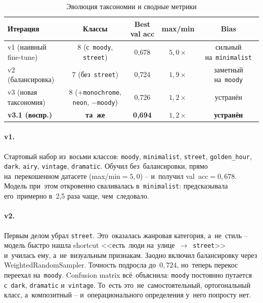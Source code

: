 \documentclass[a4paper,12pt]{diplom}
\begin{document}
\begin{table}[!ht]
\caption{Эволюция таксономии и сводные метрики}
\label{tab:taxonomy}
\centering
\begin{tabular}{lcccc}
\toprule
\textbf{Итерация} & \textbf{Классы} & \textbf{Best val acc} & \textbf{max/min} & \textbf{Bias} \\
\midrule
v1 (наивный fine-tune) & 8 (с~\texttt{moody}, \texttt{street}) & 0{,}678 & $5{,}0\times$ & сильный на~\texttt{minimalist} \\
v2 (балансировка)      & 7 (без~\texttt{street})              & 0{,}724 & $1{,}9\times$ & заметный на~\texttt{moody} \\
v3 (новая таксономия)  & 8 ($+$\texttt{monochrome}, \texttt{neon}, $-$\texttt{moody}) & 0{,}726 & $1{,}2\times$ & устранён \\
\textbf{v3.1 (воспр.)} & \textbf{та~же}                       & \textbf{0{,}694} & \textbf{$1{,}2\times$} & \textbf{устранён} \\
\bottomrule
\end{tabular}
\end{table}

\paragraph{v1.} Стартовый набор из~восьми классов: \texttt{moody}, \texttt{minimalist}, \texttt{street}, \texttt{golden\_hour}, \texttt{dark}, \texttt{airy}, \texttt{vintage}, \texttt{dramatic}. Обучил без~балансировки, прямо на~перекошенном датасете (max/min$=5{,}0$) -- и~получил val~acc$=0{,}678$. Модель при~этом откровенно сваливалась в~\texttt{minimalist}: предсказывала его~примерно в~2{,}5 раза чаще, чем~следовало.

\paragraph{v2.} Первым делом убрал \texttt{street}. Это~оказалась жанровая категория, а~не~стиль -- модель быстро нашла shortcut <<есть~люди на~улице~$\to$~\texttt{street}>> и~училась ему, а~не~визуальным признакам. Заодно включил балансировку через WeightedRandomSampler. Точность подросла до~$0{,}724$, но~теперь перекос переехал на~\texttt{moody}. Confusion matrix всё~объяснила: \texttt{moody} постоянно путается с~\texttt{dark}, \texttt{dramatic} и~\texttt{vintage}. То~есть это~не~самостоятельный, ортогональный класс, а~композитный -- и~операционального определения у~него попросту нет.
\end{document}
